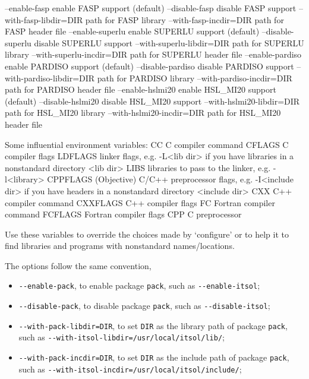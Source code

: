 \begin{evb}
  --enable-fasp      enable FASP support (default)
  --disable-fasp     disable FASP support
  --with-fasp-libdir=DIR path for FASP library
  --with-fasp-incdir=DIR path for FASP header file
  --enable-superlu      enable SUPERLU support (default)
  --disable-superlu     disable SUPERLU support
  --with-superlu-libdir=DIR path for SUPERLU library
  --with-superlu-incdir=DIR path for SUPERLU header file
  --enable-pardiso      enable PARDISO support (default)
  --disable-pardiso     disable PARDISO support
  --with-pardiso-libdir=DIR path for PARDISO library
  --with-pardiso-incdir=DIR path for PARDISO header file
  --enable-hslmi20      enable HSL_MI20 support (default)
  --disable-hslmi20     disable HSL_MI20 support
  --with-hslmi20-libdir=DIR path for HSL_MI20 library
  --with-hslmi20-incdir=DIR path for HSL_MI20 header file

Some influential environment variables:
  CC          C compiler command
  CFLAGS      C compiler flags
  LDFLAGS     linker flags, e.g. -L<lib dir> if you have libraries in a
              nonstandard directory <lib dir>
  LIBS        libraries to pass to the linker, e.g. -l<library>
  CPPFLAGS    (Objective) C/C++ preprocessor flags, e.g. -I<include dir> if
              you have headers in a nonstandard directory <include dir>
  CXX         C++ compiler command
  CXXFLAGS    C++ compiler flags
  FC          Fortran compiler command
  FCFLAGS     Fortran compiler flags
  CPP         C preprocessor

Use these variables to override the choices made by `configure' or to help
it to find libraries and programs with nonstandard names/locations.
\end{evb}

The options follow the same convention,
\begin{itemize}
\item \verb|--enable-pack|, to enable package \verb|pack|, such as \verb|--enable-itsol|;
\item \verb|--disable-pack|, to disable package \verb|pack|, such as \verb|--disable-itsol|;
\item \verb|--with-pack-libdir=DIR|, to set \verb|DIR| as the library path of package \verb|pack|, 
    such as \verb|--with-itsol-libdir=/usr/local/itsol/lib/|;
\item \verb|--with-pack-incdir=DIR|, to set \verb|DIR| as the include path of package \verb|pack|, 
    such as \verb|--with-itsol-incdir=/usr/local/itsol/include/|;
\end{itemize}

